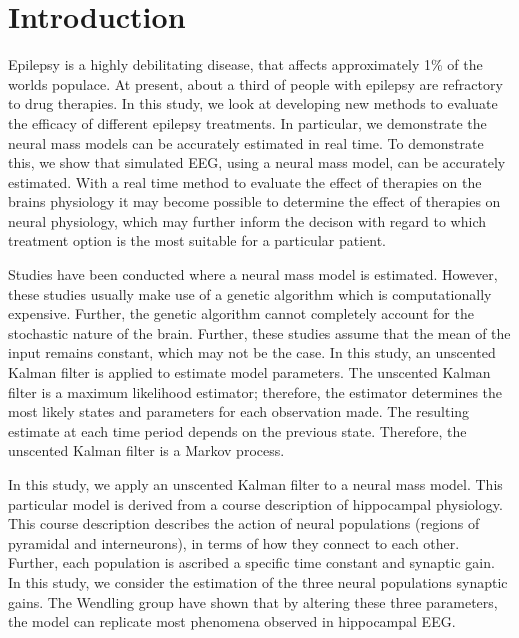 \section{Introduction}

Epilepsy is a highly debilitating disease, that affects approximately 1\% of the worlds populace. At present, about a third of people with epilepsy are refractory to drug therapies. In this study, we look at developing new methods to evaluate the efficacy of different epilepsy treatments. In particular, we demonstrate the neural mass models can be accurately estimated in real time. To demonstrate this, we show that simulated EEG, using a neural mass model, can be accurately estimated. With a real time method to evaluate the effect of therapies on the brains physiology it may become possible to determine the effect of therapies on neural physiology, which may further inform the decison with regard to which treatment option is the most suitable for a particular patient.

Studies have been conducted where a neural mass model is estimated. However, these studies usually make use of a genetic algorithm which is computationally expensive. Further, the genetic algorithm cannot completely account for the stochastic nature of the brain. Further, these studies assume that the mean of the input remains constant, which may not be the case. In this study, an unscented Kalman filter is applied to estimate model parameters. The unscented Kalman filter is a maximum likelihood estimator; therefore, the estimator determines the most likely states and parameters for each observation made. The resulting estimate at each time period depends on the previous state. Therefore, the unscented Kalman filter is a Markov process.

In this study, we apply an unscented Kalman filter to a neural mass model\iref. This particular model is derived from a course description of hippocampal physiology. This course description describes the action of neural populations (regions of pyramidal and interneurons), in terms of how they connect to each other. Further, each population is ascribed a specific time constant and synaptic gain. In this study, we consider the estimation of the three neural populations synaptic gains. The Wendling group have shown that by altering these three parameters, the model can replicate most phenomena observed in hippocampal EEG.